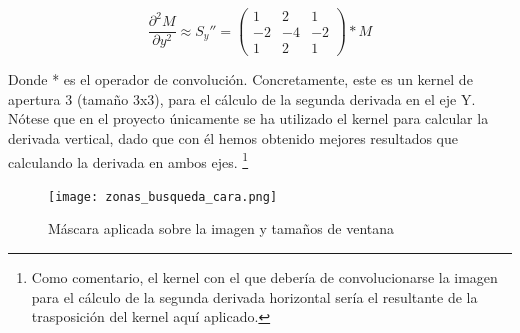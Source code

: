 \[ \frac{\partial^{2}{M}}{\partial{y^{2}}} \approx S_{y}''= \left( \begin{array}{ccc} 1 & 2 & 1 \\ -2 & -4 & -2 \\ 1 & 2 & 1  \end{array} \right) * M \]

Donde * es el operador de convolución. Concretamente, este es un kernel de apertura 3 (tamaño 3x3), para el cálculo de la segunda derivada en el eje Y. Nótese que en el proyecto únicamente se ha utilizado el kernel para calcular la derivada vertical, dado que con él hemos obtenido mejores resultados que calculando la derivada en ambos ejes. \footnote{Como comentario, el kernel con el que debería de convolucionarse la imagen para el cálculo de la segunda derivada horizontal sería el resultante de la trasposición del kernel aquí aplicado.}

\begin{figure}[h!]
	\centering
	\texttt{[image: zonas\_busqueda\_cara.png]}
	\caption{Máscara aplicada sobre la imagen y tamaños de ventana}
	\label{fig:imagen_mascaras}
\end{figure}

